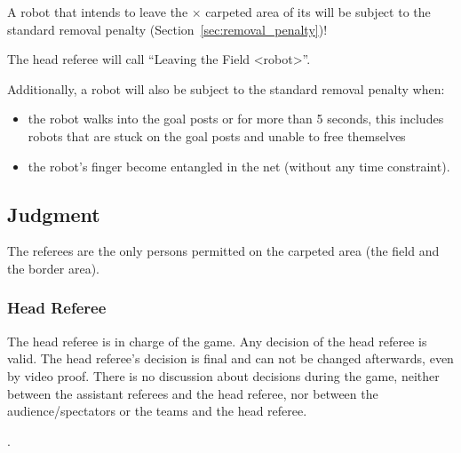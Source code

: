 A robot that intends to leave the \TotalWidth $\times$ \cbw{3.7~m\xspace} carpeted area of its  will be subject to the standard removal penalty (\cf Section~\ref{sec:removal_penalty})!


The head referee will call ``Leaving the Field \textless robot\textgreater''.

Additionally, a robot will also be subject to the standard removal penalty when:
\begin{itemize}
	\item the robot walks into the goal posts or  for more than 5 seconds, this includes robots that are stuck on the goal posts and unable to free themselves
	\item the robot's finger become entangled in the net (without any time constraint).
\end{itemize}

\subsection{Judgment}
\label{sec:judgment}
The referees are the only persons permitted on the carpeted area (\ie the field and the border area).



\subsubsection{Head Referee}
\label{sec:head_referee}

The head referee is in charge of the game. Any decision of the head referee is valid. The head referee's decision is final and can not be changed afterwards, even by video proof. There is no discussion about decisions during the game, neither between the assistant referees and the head referee, nor between the audience/spectators or the teams and the head referee.

.


